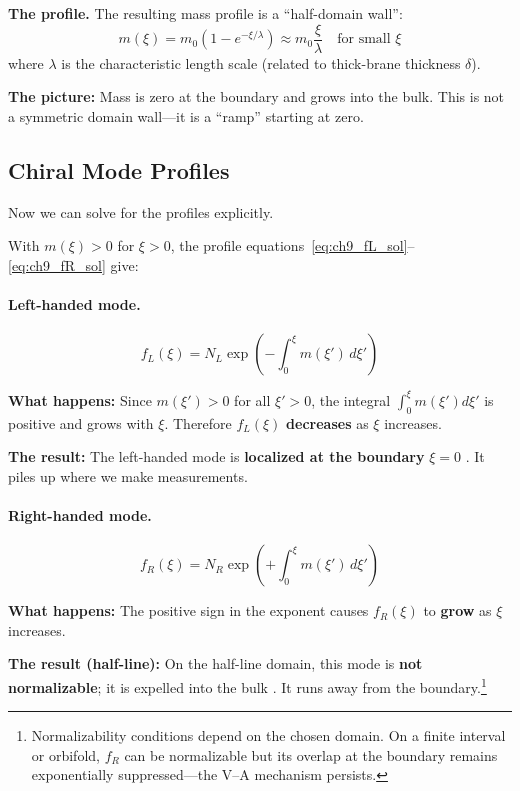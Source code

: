 \textbf{The profile.} The resulting mass profile is a ``half-domain wall'':
\begin{equation}
    m(\xi) = m_0 \left(1 - e^{-\xi/\lambda}\right) \approx m_0 \frac{\xi}{\lambda}
    \quad \text{for small } \xi
    \label{eq:ch9_mass_profile}
\end{equation}
where $\lambda$ is the characteristic length scale (related to thick-brane
thickness $\delta$).

\textbf{The picture:} Mass is zero at the boundary and grows into the bulk.
This is not a symmetric domain wall---it is a ``ramp'' starting at zero.

\subsection{Chiral Mode Profiles}

Now we can solve for the profiles explicitly.

With $m(\xi) > 0$ for $\xi > 0$, the profile equations~\eqref{eq:ch9_fL_sol}--\eqref{eq:ch9_fR_sol} give:

\paragraph{Left-handed mode.}
\begin{equation}
    f_L(\xi) = N_L \exp\left(-\int_0^\xi m(\xi') \, d\xi'\right)
    \label{eq:ch9_fL_profile}
\end{equation}

\textbf{What happens:} Since $m(\xi') > 0$ for all $\xi' > 0$, the integral
$\int_0^\xi m(\xi') d\xi'$ is positive and grows with $\xi$. Therefore $f_L(\xi)$
\textbf{decreases} as $\xi$ increases.

\textbf{The result:} The left-handed mode is \textbf{localized at the boundary}
$\xi = 0$ \tagDc{}. It piles up where we make measurements.

\paragraph{Right-handed mode.}
\begin{equation}
    f_R(\xi) = N_R \exp\left(+\int_0^\xi m(\xi') \, d\xi'\right)
    \label{eq:ch9_fR_profile}
\end{equation}

\textbf{What happens:} The positive sign in the exponent causes $f_R(\xi)$ to
\textbf{grow} as $\xi$ increases.

\textbf{The result (half-line):} On the half-line domain, this mode is
\textbf{not normalizable}; it is expelled into the bulk \tagDc{}. It runs away
from the boundary.\footnote{Normalizability conditions depend on the chosen
domain. On a finite interval or orbifold, $f_R$ can be normalizable but its
overlap at the boundary remains exponentially suppressed---the V--A mechanism
persists. \tagDc{}}

